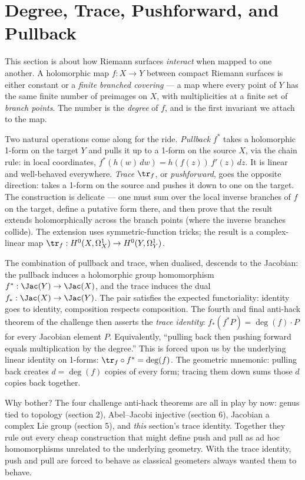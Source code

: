 \section{Degree, Trace, Pushforward, and Pullback}
\label{sec:degree-trace}

\begin{layman}
This section is about how Riemann surfaces \emph{interact} when
mapped to one another. A holomorphic map \(f : X \to Y\) between
compact Riemann surfaces is either constant or a \emph{finite
branched covering} — a map where every point of \(Y\) has the same
finite number of preimages on \(X\), with multiplicities at a
finite set of \emph{branch points}. The number is the
\emph{degree} of \(f\), and is the first invariant we attach to
the map.

Two natural operations come along for the ride. \emph{Pullback}
\(f^*\) takes a holomorphic 1-form on the target \(Y\) and pulls
it up to a 1-form on the source \(X\), via the chain rule: in
local coordinates, \(f^*(h(w)\,dw) = h(f(z))\,f'(z)\,dz\). It is
linear and well-behaved everywhere. \emph{Trace} \(\tr_f\), or
\emph{pushforward}, goes the opposite direction: takes a 1-form
on the source and pushes it down to one on the target. The
construction is delicate — one must sum over the local inverse
branches of \(f\) on the target, define a putative form there,
and then prove that the result extends holomorphically across
the branch points (where the inverse branches collide). The
extension uses symmetric-function tricks; the result is a
complex-linear map \(\tr_f : H^0(X, \Omega^1_X) \to
H^0(Y, \Omega^1_Y)\).

The combination of pullback and trace, when dualised, descends to
the Jacobian: the pullback induces a holomorphic group
homomorphism \(f^* : \Jac(Y) \to \Jac(X)\), and the trace induces
the dual \(f_* : \Jac(X) \to \Jac(Y)\). The pair satisfies the
expected functoriality: identity goes to identity, composition
respects composition. The fourth and final anti-hack theorem of
the challenge then asserts the \emph{trace identity}:
\(f_*(f^* P) = \deg(f) \cdot P\)
for every Jacobian element \(P\). Equivalently, ``pulling back
then pushing forward equals multiplication by the degree.'' This
is forced upon us by the underlying linear identity on 1-forms:
\(\tr_f \circ f^* = \deg(f)\).
The geometric mnemonic: pulling back creates \(d = \deg(f)\)
copies of every form; tracing them down sums those \(d\) copies
back together.

Why bother? The four challenge anti-hack theorems are all in
play by now: genus tied to topology (section 2), Abel--Jacobi
injective (section 6), Jacobian a complex Lie group (section 5),
and \emph{this} section's trace identity. Together they rule out
every cheap construction that might define push and pull as ad
hoc homomorphisms unrelated to the underlying geometry. With the
trace identity, push and pull are forced to behave as classical
geometers always wanted them to behave.
\end{layman}

